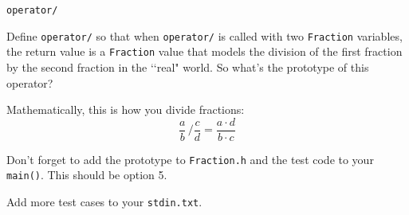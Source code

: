 \verb!operator/!

Define \verb!operator/! so that when \verb!operator/! is called with two
\verb!Fraction! variables, the return value is a \verb!Fraction! value that
models the division of the first fraction by the second fraction in the
\lq\lq real" world. So what's the prototype of this operator?

Mathematically, this is how you divide fractions:
\[
\frac{a}{b}
\,
\biggl/
\frac{c}{d}
=
\frac{a \cdot d}{b \cdot c}
\]

Don't forget to add the prototype to \verb!Fraction.h! and the test code to
your \verb!main()!. This should be option 5.

Add more test cases to your \verb!stdin.txt!.
